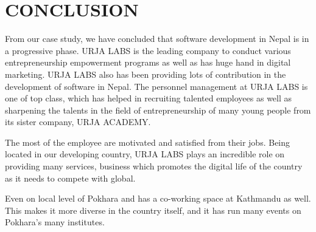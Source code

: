 \chapter{CONCLUSION}

From our case study, we have concluded that software development in Nepal is in a progressive phase. URJA LABS is the leading company to conduct various entrepreneurship empowerment programs as well as has huge hand in digital marketing. URJA LABS also has been providing lots of contribution in the development of software in Nepal. The personnel management at URJA LABS is one of top class, which has helped in recruiting talented employees as well as sharpening the talents in the field of entrepreneurship of many young people from its sister company, URJA ACADEMY.

The most of the employee are motivated and satisfied from their jobs.
Being located in our developing country, URJA LABS plays an incredible role on providing many services, business which promotes the digital life of the country as it needs to compete with global.

Even on local level of Pokhara and has a co-working space at Kathmandu as well. This makes it more diverse in the country itself, and it has run many events on Pokhara's many institutes. 
